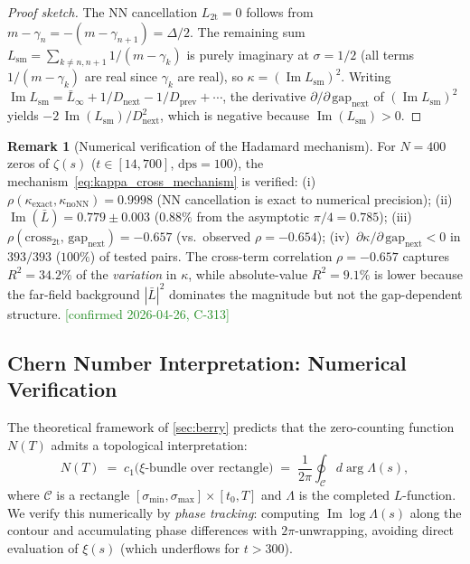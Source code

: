 \documentclass[11pt, a4paper]{article}
\theoremstyle{definition}
\newtheorem{remark}{Remark}[section]
\theoremstyle{plain}
\newcommand{\xif}{\xi}                      %
\begin{document}
\begin{proof}[Proof sketch]
The NN cancellation $L_{\mathrm{2t}} = 0$ follows from
$m - \gamma_n = -(m - \gamma_{n+1}) = \Delta/2$.
The remaining sum $L_{\mathrm{sm}} = \sum_{k\neq n,n+1} 1/(m-\gamma_k)$
is purely imaginary at $\sigma = 1/2$ (all terms $1/(m-\gamma_k)$
are real since $\gamma_k$ are real), so $\kappa = (\operatorname{Im} L_{\mathrm{sm}})^2$.
Writing $\operatorname{Im} L_{\mathrm{sm}} = \bar{L}_{\infty}
+ 1/D_{\mathrm{next}} - 1/D_{\mathrm{prev}} + \cdots$, the
derivative $\partial/\partial\,\mathrm{gap}_{\mathrm{next}}$ of
$(\operatorname{Im} L_{\mathrm{sm}})^2$ yields
$-2\,\operatorname{Im}(L_{\mathrm{sm}})/D_{\mathrm{next}}^2$,
which is negative because $\operatorname{Im}(L_{\mathrm{sm}}) > 0$.
\end{proof}

\begin{remark}[Numerical verification of the Hadamard mechanism]
\label{rem:midpoint_hadamard_numerical}
For $N = 400$ zeros of $\zeta(s)$ ($t \in [14, 700]$, $\mathrm{dps} = 100$),
the mechanism~\eqref{eq:kappa_cross_mechanism} is verified:
(i)~$\rho(\kappa_{\mathrm{exact}}, \kappa_{\mathrm{noNN}}) = 0.9998$
(NN cancellation is exact to numerical precision);
(ii)~$\operatorname{Im}(\bar{L}) = 0.779 \pm 0.003$
($0.88\%$ from the asymptotic $\pi/4 = 0.785$);
(iii)~$\rho(\mathrm{cross}_{\mathrm{2t}},\, \mathrm{gap}_{\mathrm{next}})
= -0.657$ (vs.\ observed $\rho = -0.654$);
(iv)~$\partial\kappa/\partial\,\mathrm{gap}_{\mathrm{next}} < 0$
in $393/393$ ($100\%$) of tested pairs.
The cross-term correlation $\rho = -0.657$ captures $R^2 = 34.2\%$
of the \emph{variation} in $\kappa$, while absolute-value $R^2 = 9.1\%$
is lower because the far-field background $|\bar{L}|^2$ dominates
the magnitude but not the gap-dependent structure.
\textcolor{ForestGreen}{[confirmed 2026-04-26, C-313]}
\end{remark}


\subsection{Chern Number Interpretation: Numerical Verification}
\label{sec:chern_verification}

The theoretical framework of \cref{sec:berry} predicts that the
zero-counting function $N(T)$ admits a topological interpretation:
\begin{equation}
  N(T) \;=\; c_1\bigl(\text{$\xif$-bundle over rectangle}\bigr)
        \;=\; \frac{1}{2\pi}\oint_{\mathcal{C}}
              d\!\operatorname{arg}\Lambda(s),
  \label{eq:chern_counting}
\end{equation}
where $\mathcal{C}$ is a rectangle $[\sigma_{\min}, \sigma_{\max}]
\times [t_0, T]$ and $\Lambda$ is the completed $L$-function.
We verify this numerically by \emph{phase tracking}: computing
$\operatorname{Im}\!\log\Lambda(s)$ along the contour and accumulating
phase differences with $2\pi$-unwrapping, avoiding direct evaluation
of $\xif(s)$ (which underflows for $t > 300$).
\end{document}
